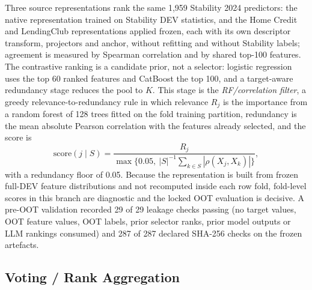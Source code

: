 \documentclass[final,5p,twocolumn]{elsarticle}
\newcommand{\Kfeat}{K}
\begin{document}
Three source representations rank the same 1,959 Stability 2024 predictors: the native representation trained on Stability DEV statistics, and the Home Credit and LendingClub representations applied frozen, each with its own descriptor transform, projectors and anchor, without refitting and without Stability labels; agreement is measured by Spearman correlation \cite{spearman1904} and by shared top-100 features. The contrastive ranking is a candidate prior, not a selector: logistic regression uses the top 60 ranked features and CatBoost the top 100, and a target-aware redundancy stage reduces the pool to $\Kfeat$. This stage is the \emph{RF/correlation filter}, a greedy relevance-to-redundancy rule in which relevance $R_j$ is the importance from a random forest of 128 trees fitted on the fold training partition, redundancy is the mean absolute Pearson correlation with the features already selected, and the score is
\begin{equation}
    \mathrm{score}(j\mid S)=\frac{R_j}{\max\{0.05,\ |S|^{-1}\sum_{k\in S}|\rho(X_j,X_k)|\}} ,
    \label{eq:legacy_mrmr}
\end{equation}
with a redundancy floor of 0.05. Because the representation is built from frozen full-DEV feature distributions and not recomputed inside each row fold, fold-level scores in this branch are diagnostic and the locked OOT evaluation is decisive. A pre-OOT validation recorded 29 of 29 leakage checks passing (no target values, OOT feature values, OOT labels, prior selector ranks, prior model outputs or LLM rankings consumed) and 287 of 287 declared SHA-256 checks on the frozen artefacts.

\subsection{Voting / Rank Aggregation}
\label{subsec:voting_fs}
\end{document}
